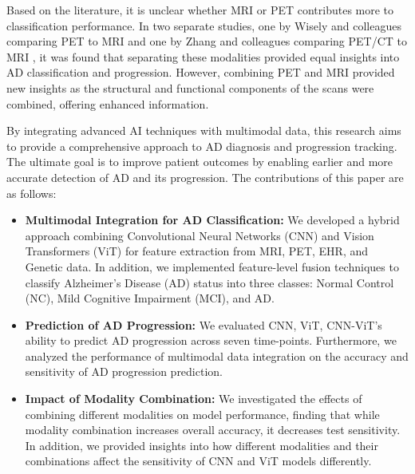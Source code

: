 Based on the literature, it is unclear whether MRI or PET contributes more to classification performance. In two separate studies, one by Wisely and colleagues comparing PET to MRI \cite{wisely_convolutional_2022} and one by Zhang and colleagues comparing PET/CT to MRI \cite{zhang_petmr_2017}, it was found that separating these modalities provided equal insights into AD classification and progression. However, combining PET and MRI provided new insights as the structural and functional components of the scans were combined, offering enhanced information. 

By integrating advanced AI techniques with multimodal data, this research aims to provide a comprehensive approach to AD diagnosis and progression tracking. The ultimate goal is to improve patient outcomes by enabling earlier and more accurate detection of AD and its progression. The contributions of this paper are as follows:
\begin{itemize}
    \item \textbf{Multimodal Integration for AD Classification:}
    We developed a hybrid approach combining Convolutional Neural Networks (CNN) and Vision Transformers (ViT) for feature extraction from MRI, PET, EHR, and Genetic data. In addition, we implemented feature-level fusion techniques to classify Alzheimer's Disease (AD) status into three classes: Normal Control (NC), Mild Cognitive Impairment (MCI), and AD.
    
    \item \textbf{Prediction of AD Progression:}
    We evaluated CNN, ViT, CNN-ViT's ability to predict AD progression across seven time-points. Furthermore, we analyzed the performance of multimodal data integration on the accuracy and sensitivity of AD progression prediction.
    
    \item \textbf{Impact of Modality Combination:}
    We investigated the effects of combining different modalities on model performance, finding that while modality combination increases overall accuracy, it decreases test sensitivity. In addition, we provided insights into how different modalities and their combinations affect the sensitivity of CNN and ViT models differently.

 
\end{itemize}\ 

 